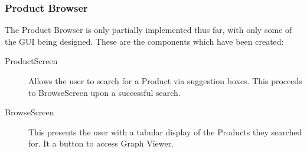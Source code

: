 \subsubsection{Product Browser}
The Product Browser is only partially implemented thus far, with only some of the GUI being designed.
These are the components which have been created:
\begin{description}
\item[ProductScreen] Allows the user to search for a Product via suggestion boxes. This proceeds to BrowseScreen upon a successful search.
\item[BrowseScreen] This presents the user with a tabular display of the Products they searched for. It a button to access Graph Viewer.
\end{description}
